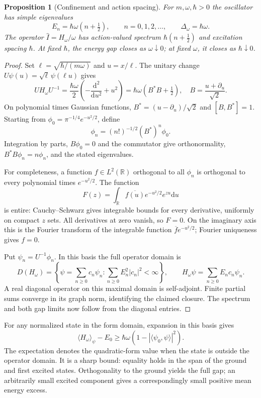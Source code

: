 \documentclass[11pt,a4paper]{article}
\newtheorem{proposition}{Proposition}
\newcommand{\dd}{\mathrm{d}}
\newcommand{\R}{\mathbb R}
\begin{document}
\begin{proposition}[Confinement and action spacing]\label{prop:oscillator}
For $m,\omega,\hbar>0$ the oscillator has simple eigenvalues
\[
 E_n=\hbar\omega(n+\tfrac12),\qquad n=0,1,2,\ldots,
 \qquad \Delta_\omega=\hbar\omega.
\]
The operator $\widehat I=H_\omega/\omega$ has action-valued spectrum
$\hbar(n+\tfrac12)$ and excitation spacing $\hbar$.
At fixed $\hbar$, the energy gap closes as $\omega\downarrow0$; at fixed
$\omega$, it closes as $\hbar\downarrow0$.
\end{proposition}
\begin{proof}
Set $\ell=\sqrt{\hbar/(m\omega)}$ and $u=x/\ell$. The unitary change
$U\psi(u)=\sqrt\ell\,\psi(\ell u)$ gives
\[
 UH_\omega U^{-1}=\frac{\hbar\omega}{2}
       \left(-\frac{\dd^2}{\dd u^2}+u^2\right)
       =\hbar\omega(B^*B+\tfrac12),
 \quad B=\frac{u+\partial_u}{\sqrt2}.
\]
On polynomial times Gaussian functions, $B^*=(u-\partial_u)/\sqrt2$ and
$[B,B^*]=1$. Starting from $\phi_0=\pi^{-1/4}e^{-u^2/2}$, define
\[
 \phi_n=(n!)^{-1/2}(B^*)^n\phi_0.
\]
Integration by parts, $B\phi_0=0$ and the commutator give orthonormality,
$B^*B\phi_n=n\phi_n$, and the stated eigenvalues.

For completeness, a function $f\in L^2(\R)$ orthogonal to all $\phi_n$ is
orthogonal to every polynomial times $e^{-u^2/2}$. The function
\[
 F(z)=\int_\R\overline{f(u)}e^{-u^2/2}e^{zu}\dd u
\]
is entire: Cauchy--Schwarz gives integrable bounds for every derivative,
uniformly on compact $z$ sets. All derivatives at zero vanish, so $F=0$.
On the imaginary axis this is the Fourier transform of the integrable function
$\overline f e^{-u^2/2}$; Fourier uniqueness gives $f=0$.

Put $\psi_n=U^{-1}\phi_n$. In this basis the full operator domain is
\[
 D(H_\omega)=\left\{\psi=\sum_{n\ge0}c_n\psi_n:
                \sum_{n\ge0}E_n^2|c_n|^2<\infty\right\},
 \qquad H_\omega\psi=\sum_{n\ge0}E_nc_n\psi_n.
\]
A real diagonal operator on this maximal domain is self-adjoint. Finite
partial sums converge in its graph norm, identifying the claimed closure.
The spectrum and both gap limits now follow from the diagonal entries.
\end{proof}

For any normalized state in the form domain, expansion in this basis gives
\begin{equation}\label{eq:osc-coercivity}
 \langle H_\omega\rangle_\psi-E_0
 \ge\hbar\omega(1-|\langle\psi_0,\psi\rangle|^2).
\end{equation}
The expectation denotes the quadratic-form value when the state is outside
the operator domain. It is a sharp bound: equality holds in the span of the
ground and first excited states. Orthogonality to the ground yields the full
gap; an arbitrarily small excited component gives a correspondingly small
positive mean energy excess.
\end{document}
